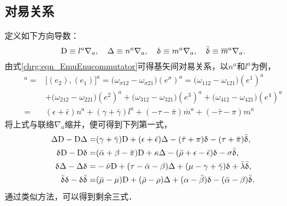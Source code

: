 \subsection{对易关系}
定义如下方向导数：
\begin{equation}\label{chnull:eqn_direct-D}
    {\rm D}\equiv l^a\nabla_a , \quad
        {\Delta}\equiv n^a\nabla_a , \quad
        {\updelta}\equiv m^a\nabla_a , \quad
        {\bar{\updelta}}\equiv \overline{m}^a\nabla_a .
\end{equation}
由式\eqref{chrg:eqn_EmuEnucommutator}可得基矢间对易关系，以$n^a$和$l^a$为例，
\begin{align*}
    [n, l]^a = &\bigl[(e_2), (e_1)\bigr]^a
    = \bigl(\omega_{\sigma 12} - \omega_{\sigma 21}\bigr) (e^\sigma)^a
    =\bigl(\omega_{112} - \omega_{121}\bigr) (e^1)^a  \\
    &+\bigl(\omega_{212} - \omega_{221}\bigr) (e^2)^a
    +\bigl(\omega_{312} - \omega_{321}\bigr) (e^3)^a
    +\bigl(\omega_{412} - \omega_{421}\bigr) (e^4)^a  \\
    =&  (\epsilon + \bar{\epsilon}) n^a
    +(\gamma + \bar{\gamma}) l^a
    +(-\tau - \bar{\pi}) \overline{m}^a
    +(-\bar{\tau} - \pi) m^a
\end{align*}
将上式与联络$\nabla_a$缩并，便可得到下列第一式，
\begin{subequations}\label{chnull:eqn_DDcomunicator}
    \begin{align}
        \Delta {\rm D}-{\rm D}\Delta =&(\gamma +\bar{\gamma}){\rm D}+(\epsilon +\bar{\epsilon})\Delta
        -(\bar{\tau}+\pi )\updelta -(\tau +\bar{\pi})\bar{\updelta},
        \label{chnull:eqn_DDcomunicator-a}\\
        \updelta {\rm D}-{\rm D}\updelta =&(\bar{\alpha}+\beta -\bar{\pi}){\rm D}+\kappa\Delta
        -(\bar{\rho}+\epsilon -\bar{\epsilon})\updelta -\sigma\bar{\updelta},
        \label{chnull:eqn_DDcomunicator-b}\\
        \updelta \Delta-\Delta \updelta =&-\bar{\nu}{\rm D}+(\tau -\bar{\alpha} -\beta )\Delta
        +(\mu -\gamma +\bar{\gamma})\updelta +\bar{\lambda}\bar{\updelta },
        \label{chnull:eqn_DDcomunicator-c}\\
        \bar{\updelta}\updelta-\updelta \bar{\updelta} =&(\bar{\mu}-\mu ){\rm D}+(\bar{\rho} -\rho )\Delta
        +(\alpha -\bar{\beta})\updelta -(\bar{\alpha}-\beta )\bar{\updelta} .
        \label{chnull:eqn_DDcomunicator-d}
    \end{align}
\end{subequations}
通过类似方法，可以得到剩余三式．


